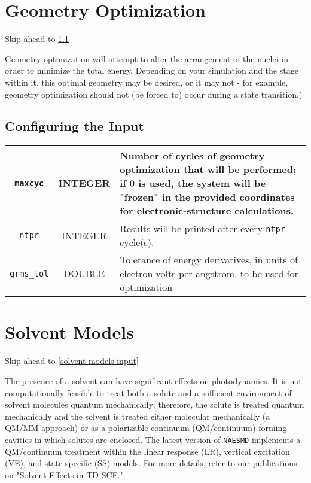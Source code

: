 \documentclass[12pt,letter,footinclude=true,headinclude=true,hyphens]{book} %
\begin{document}
    \section{Geometry Optimization}
    
    Skip ahead to \ref{geo-opt-input}
    
    Geometry optimization will attempt to alter the arrangement of the nuclei in order to minimize the total energy. Depending on your simulation and the stage within it, this optimal geometry may be desired, or it may not - for example, geometry optimization should not (be forced to) occur during a state transition.)
    
    \subsection{Configuring the Input}
    \label{geo-opt-input}
    
    \begin{tabular}{ | c | c | p{7cm} | }
    \hline
    \texttt{maxcyc} & INTEGER & Number of cycles of geometry optimization that will be performed; if $0$ is used, the system will be "frozen" in the provided coordinates for electronic-structure calculations. \\ \hline
    \texttt{ntpr} & INTEGER & Results will be printed after every \texttt{ntpr} cycle(s). \\ \hline
    \texttt{grms\_tol} & DOUBLE & Tolerance of energy derivatives, in units of electron-volts per angstrom, to be used for optimization \\
    \hline
    \end{tabular}
    
    \section{Solvent Models}

    Skip ahead to \ref{solvent-models-input}
    
    The presence of a solvent can have significant effects on photodynamics. It is not computationally feasible to treat both a solute and a sufficient environment of solvent molecules quantum mechanically; therefore, the solute is treated quantum mechanically and the solvent is treated either molecular mechanically (a QM/MM approach) or as a polarizable continuum (QM/continuum) forming cavities in which solutes are enclosed. The latest version of \texttt{NAESMD} implements a QM/continuum treatment within the linear response (LR), vertical excitation (VE), and state-specific (SS) models. For more details, refer to our publications on "Solvent Effects in TD-SCF."
    
\end{document}
